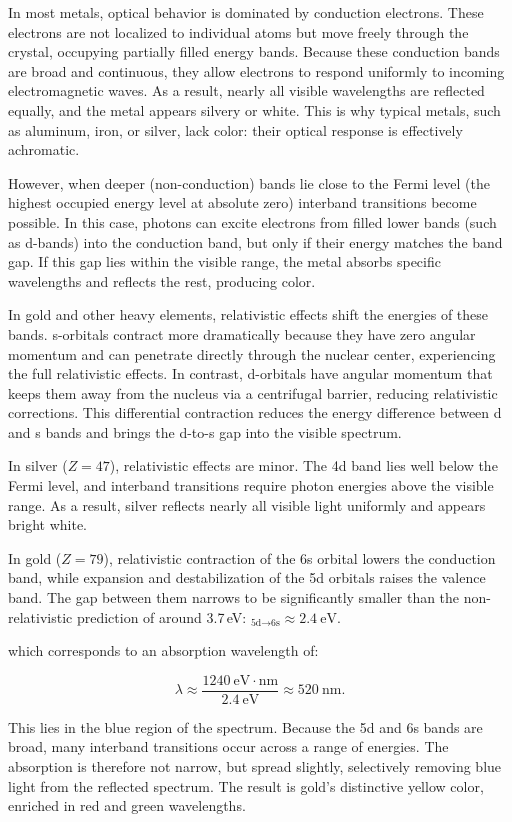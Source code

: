 In most metals, optical behavior is dominated by conduction electrons. These electrons are not localized to individual atoms but move freely through the crystal, occupying partially filled energy bands. Because these conduction bands are broad and continuous, they allow electrons to respond uniformly to incoming electromagnetic waves. As a result, nearly all visible wavelengths are reflected equally, and the metal appears silvery or white. This is why typical metals, such as aluminum, iron, or silver, lack color: their optical response is effectively achromatic.

However, when deeper (non-conduction) bands lie close to the Fermi level (the highest occupied energy level at absolute zero) interband transitions become possible. In this case, photons can excite electrons from filled lower bands (such as d-bands) into the conduction band, but only if their energy matches the band gap. If this gap lies within the visible range, the metal absorbs specific wavelengths and reflects the rest, producing color.

In gold and other heavy elements, relativistic effects shift the energies of these bands. s-orbitals contract more dramatically because they have zero angular momentum and can penetrate directly through the nuclear center, experiencing the full relativistic effects. In contrast, d-orbitals have angular momentum that keeps them away from the nucleus via a centrifugal barrier, reducing relativistic corrections. This differential contraction reduces the energy difference between d and s bands and brings the d-to-s gap into the visible spectrum.

In silver ($Z = 47$), relativistic effects are minor. The 4d band lies well below the Fermi level, and interband transitions require photon energies above the visible range. As a result, silver reflects nearly all visible light uniformly and appears bright white.

In gold ($Z = 79$), relativistic contraction of the 6s orbital lowers the conduction band, while expansion and destabilization of the 5d orbitals raises the valence band. The gap between them narrows to be significantly smaller than the non-relativistic prediction of around 3.7 eV: $_{\text{5d} \to \text{6s}} \approx 2.4\ \text{eV}.$

which corresponds to an absorption wavelength of:

$$
\lambda \approx \frac{1240\ \text{eV}\cdot\text{nm}}{2.4\ \text{eV}} \approx 520\ \text{nm}.
$$

This lies in the blue region of the spectrum. Because the 5d and 6s bands are broad, many interband transitions occur across a range of energies. The absorption is therefore not narrow, but spread slightly, selectively removing blue light from the reflected spectrum. The result is gold’s distinctive yellow color, enriched in red and green wavelengths.

